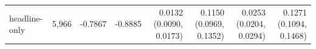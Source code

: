 \begin{tabular}{lrrrrrrr}
headline-only & 5,966 & -0.7867 & -0.8885 & 0.0132 (0.0090, 0.0173) & 0.1150 (0.0969, 0.1352) & 0.0253 (0.0204, 0.0294) & 0.1271 (0.1094, 0.1468) \\

\end{tabular}
